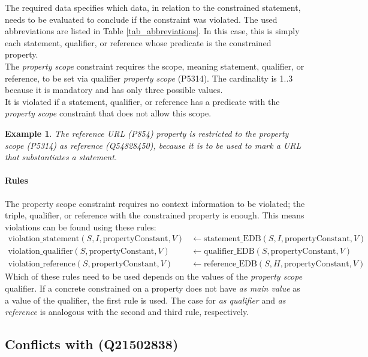 \documentclass[hyperref,bachelorofscience,fleqn]{cgvpub}
\newtheorem{example}{Example}
\begin{document}
The required data specifies which data, in relation to the constrained statement, needs to be evaluated to conclude if the constraint was violated. The used abbreviations are listed in Table \ref{tab_abbreviations}. In this case, this is simply each statement, qualifier, or reference whose predicate is the constrained property.\\
The \emph{property scope} constraint requires the scope, meaning statement, qualifier, or reference, to be set via qualifier \emph{property scope} (P5314). The cardinality is 1..3 because it is mandatory and has only three possible values.\\
It is violated if a statement, qualifier, or reference has a predicate with the \emph{property scope} constraint that does not allow this scope.\\

\begin{example}
The \emph{reference URL} (P854) property is restricted to the \emph{property scope} (P5314) \emph{as reference} (Q54828450), because it is to be used to mark a URL that substantiates a statement.
\end{example}

\paragraph{Rules}
The property scope constraint requires no context information to be violated; the triple, qualifier, or reference with the constrained property is enough. This means violations can be found using these rules:
\begin{align*}
\text{violation\_statement}(S, I, \text{propertyConstant}, V) &\leftarrow \text{statement\_EDB}(S, I, \text{propertyConstant}, V)\\
\text{violation\_qualifier}(S, \text{propertyConstant}, V) &\leftarrow \text{qualifier\_EDB}(S, \text{propertyConstant}, V)\\
\text{violation\_reference}(S, \text{propertyConstant}, V) &\leftarrow \text{reference\_EDB}(S, H, \text{propertyConstant}, V)
\end{align*}
Which of these rules need to be used depends on the values of the \emph{property scope} qualifier. If a concrete constrained on a property does not have \emph{as main value} as a value of the qualifier, the first rule is used. The case for \emph{as qualifier} and \emph{as reference} is analogous with the second and third rule, respectively.

\subsection{Conflicts with (Q21502838)}
\end{document}
